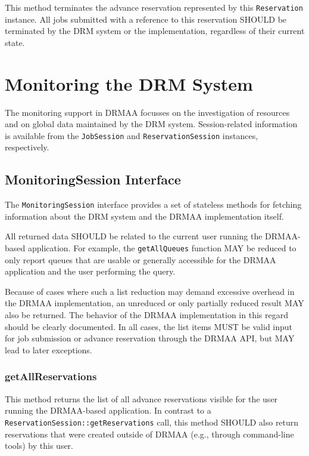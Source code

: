 \documentclass{article}
\newcommand{\h}[1]{\lstinline|#1|}
\begin{document}
This method terminates the advance reservation represented by this \h{Reservation} instance. All jobs submitted with a reference to this reservation SHOULD be terminated by the DRM system or the implementation, regardless of their current state.

\section{Monitoring the DRM System}

The monitoring support in DRMAA focusses on the investigation of resources and on global data maintained by the DRM system. Session-related information is available from the \h{JobSession} and \h{ReservationSession} instances, respectively.

\subsection{MonitoringSession Interface}
\label{sec:monitoringsession}

The \h{MonitoringSession} interface provides a set of stateless methods for fetching information about the DRM system and the DRMAA implementation itself.



All returned data SHOULD be related to the current user running the DRMAA-based application. For example, the \h{getAllQueues} function MAY be reduced to only report queues that are usable or generally accessible for the DRMAA application and the user performing the query. 

Because of cases where such a list reduction may demand excessive overhead in the DRMAA implementation, an unreduced or only partially reduced result MAY also be returned. The behavior of the DRMAA implementation in this regard should be clearly documented. In all cases, the list items MUST be valid input for job submission or advance reservation through the DRMAA API, but MAY lead to later exceptions.

\subsubsection{getAllReservations}
\label{sec:getallreservations}

This method returns the list of all advance reservations visible for the user running the DRMAA-based application. In contrast to a \h{ReservationSession::getReservations} call, this method SHOULD also return reservations that were created outside of DRMAA (e.g., through command-line tools) by this user. 
\end{document}
